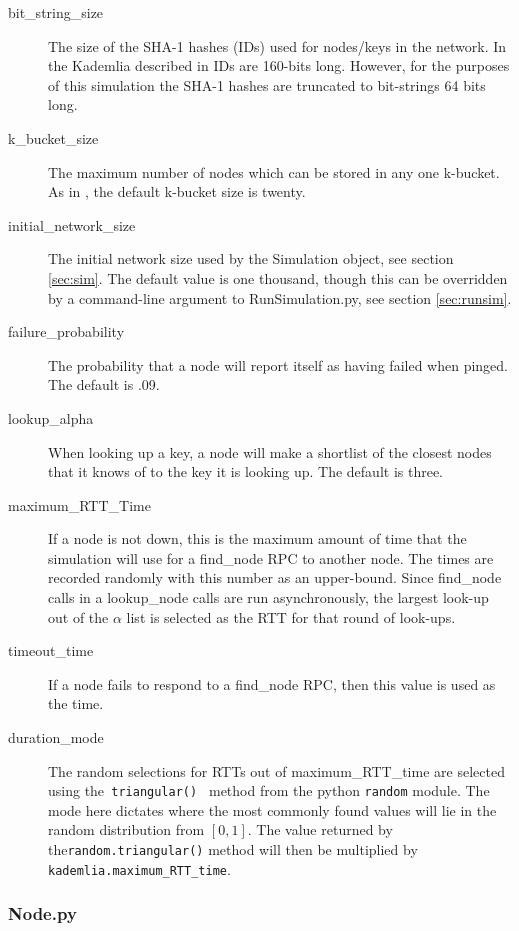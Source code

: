 \documentclass[notitlepage,12pt]{article}
\begin{document}
\begin{description}
  \item[bit\_string\_size] The size of the SHA-1 hashes (IDs) used for
    nodes/keys in the network. In the Kademlia described in
    \cite{kademlia} IDs are 160-bits long. However, for the purposes
    of this simulation the SHA-1 hashes are truncated to bit-strings 64 bits long.
  \item[k\_bucket\_size] The maximum number of nodes which can be stored
    in any one k-bucket. As in \cite{kademlia}, the default k-bucket
    size is twenty.
  \item[initial\_network\_size] The initial network size used by the
    Simulation object, see section \ref{sec:sim}. The default value is
    one thousand, though this can be overridden by a command-line
    argument to RunSimulation.py, see section \ref{sec:runsim}.
  \item[failure\_probability] The probability that a node will report
    itself as having failed when pinged. The default is .09.
  \item[lookup\_alpha] When looking up a key, a node will make a
    shortlist of the closest nodes that it knows of to the key it is
    looking up. The default is three.
  \item[maximum\_RTT\_Time] If a node is not down, this is the maximum
    amount of time that the simulation will use for a find\_node RPC to
    another node. The times are recorded randomly with this number as
    an upper-bound. Since find\_node calls in a lookup\_node calls are
    run asynchronously, the largest look-up out of the $\alpha$ list
    is selected as the RTT for that round of look-ups.
  \item[timeout\_time] If a node fails to respond to a
    find\_node RPC, then this value is used as the time.
  \item[duration\_mode] The random selections for RTTs out of
    maximum\_RTT\_time are selected using the\texttt{ triangular() } method from the python 
\texttt{random} 
 module. The mode here
    dictates where the most commonly found values will lie in the
    random distribution from $[0,1]$. The value returned by the\texttt{random.triangular()}
method will then be multiplied by \texttt{kademlia.maximum\_RTT\_time}.
\end{description}

\subsubsection{Node.py}
\label{sec:node}
\end{document}
